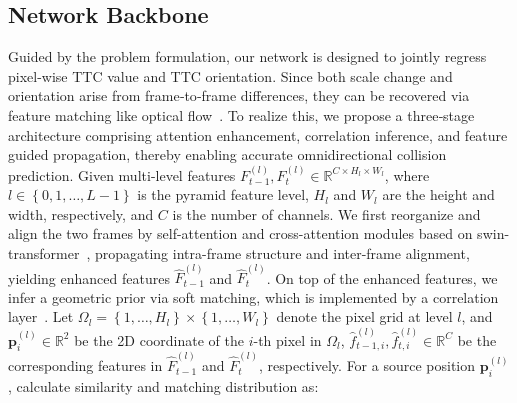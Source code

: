 \documentclass[journal]{IEEEtran}
\begin{document}
\subsection{Network Backbone}
\label{sec:backbone}
Guided by the problem formulation, our network is designed to jointly regress pixel-wise TTC value and TTC orientation. Since both scale change and orientation arise from frame‐to‐frame differences, they can be recovered via feature matching like optical flow~\cite{xu2022gmflow}. 
To realize this, we propose a three‐stage architecture comprising attention enhancement, correlation inference, and feature guided propagation, thereby enabling accurate omnidirectional collision prediction. Given multi-level features \(F_{t-1}^{(l)}, F_{t}^{(l)} \in \mathbb{R}^{C\times H_l\times W_l}\), where \(l\in \left\{ 0,1,\dots,L-1 \right\} \) is the pyramid feature level, \(H_l\) and \(W_l\) are the height and width, respectively, and \(C\) is the number of channels. We first reorganize and align the two frames by self-attention and cross-attention modules based on swin-transformer~\cite{liu2021swin}, propagating intra-frame structure and inter-frame alignment, yielding enhanced features \(\hat{F}_{t-1}^{(l)}\) and \(\hat{F}_{t}^{(l)}\). On top of the enhanced features, we infer a geometric prior via soft matching, which is implemented by a correlation layer~\cite{xu2022gmflow}. Let \(\Omega_l = \left\{1,\dots,H_l \right\} \times \left\{1,\dots,W_l \right\}\) denote the pixel grid at level \(l\), and \(\mathbf{p}_i^{(l)}\in \mathbb{R}^2\) be the 2D coordinate of the \(i\)-th pixel in \(\Omega_l\), \(\hat f_{t-1,i}^{(l)},\hat f_{t,i}^{(l)} \in \mathbb{R}^C\) be the corresponding features in \(\hat{F}_{t-1}^{(l)}\) and \(\hat{F}_{t}^{(l)}\), respectively. For a source position \(\mathbf{p}_i^{(l)}\), calculate similarity and matching distribution as:
\end{document}
